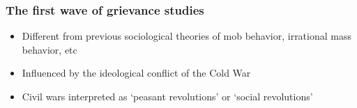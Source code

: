 \documentclass[utf8, xcolor=dvipsnames]{beamer}
\begin{document}
\begin{frame}
\frametitle{The first wave of grievance studies}
\centering

\begin{itemize}[<+->]
  \item Different from previous sociological theories of mob behavior, irrational mass behavior, etc
  \item Influenced by the ideological conflict of the Cold War
  \item Civil wars interpreted as `peasant revolutions' or `social revolutions'
\end{itemize}

\end{frame}
\end{document}
